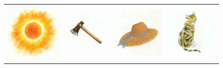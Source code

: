 \documentclass[output=paper,newtxmath,modfonts,nonflat,draftmode]{langsci/langscibook}
\begin{document}
\begin{figure}
\begin{tabularx}{\textwidth}{XXXX}
\includegraphics[width=.2\textwidth]{figures/takam-img9.png}  &
\includegraphics[width=.2\textwidth]{figures/takam-img10.png} & 
\includegraphics[width=.2\textwidth]{figures/takam-img11.png}  & 
\includegraphics[width=.2\textwidth]{figures/takam-img12.png}\\
\end{tabularx}
\end{figure}
\end{document}
